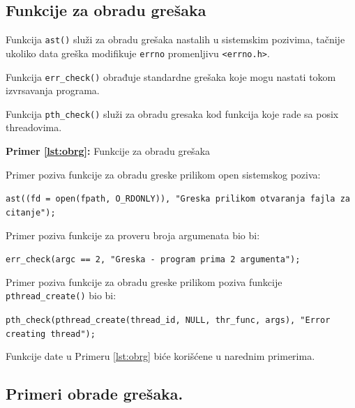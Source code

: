 \documentclass[a4paper, 11pt, twoside]{article}
\newcommand{\scode}[3] {
	\hspace{.06\textwidth} 
	\begin{minipage}[t]{.88\textwidth} %
		\begin{mdframed}[topline=true,bottomline=true,leftline=true,rightline=true,backgroundcolor=gray!22, linecolor=gray!60!black,roundcorner=1mm]
			 

	\begin{center}
		\caption{\textbf{Primer \ref{lst:#3}:} #2}
	\end{center}
	\end{mdframed}
	\end{minipage}

}
\begin{document}
\subsection{Funkcije za obradu grešaka}

Funkcija \texttt{ast()} služi za obradu grešaka nastalih u sistemskim pozivima, tačnije ukoliko data greška modifikuje \texttt{errno} promenljivu \texttt{<errno.h>}. 

Funkcija \texttt{err\_check()} obrađuje standardne grešaka koje mogu nastati tokom izvrsavanja programa.

Funkcija \texttt{pth\_check()} služi za obradu gresaka kod funkcija koje rade sa posix threadovima.

\scode{ast.c}{Funkcije za obradu grešaka}{obrg}
\vspace{2mm} 

\vspace{2mm} 
Primer poziva funkcije za obradu greske prilikom open sistemskog poziva: \\

\begin{center}
\vspace{-5mm} 
	\texttt{ast((fd = open(fpath, O\_RDONLY)), "Greska prilikom otvaranja fajla za citanje");} 
\end{center}
Primer poziva funkcije za proveru broja argumenata bio bi: \\

\begin{center}
\vspace{-5mm} 
\texttt{err\_check(argc == 2, "Greska - program prima 2 argumenta");} 
\end{center}
Primer poziva funkcije za obradu greske prilikom poziva funkcije \texttt{pthread\_create()} bio bi: \\

	\begin{center}
		\vspace{-5mm} 
		\texttt{pth\_check(pthread\_create(thread\_id, NULL, thr\_func, args), "Error creating thread");}
	\end{center}

	\vspace{1mm} 

Funkcije date u Primeru \ref{lst:obrg} biće korišćene u narednim primerima.

\newpage

\subsection{Primeri obrade grešaka.}
\end{document}
